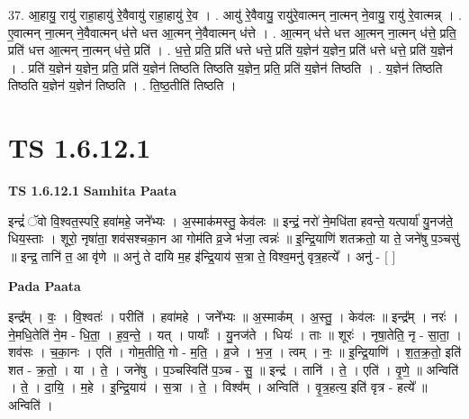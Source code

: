 \documentclass[17pt]{extarticle}
\begin{document}
37. आ॒हायु॒ रायु॑ राहा॒हायु॑ रे॒वैवायु॑ राहा॒हायु॑ रे॒व । . आयु॑ रे॒वैवायु॒ रायु॑रे॒वात्मन् ना॒त्मन् ने॒वायु॒ रायु॑ रे॒वात्मन्न् । . ए॒वात्मन् ना॒त्मन् ने॒वैवात्मन् ध॑त्ते धत्त आ॒त्मन् ने॒वैवात्मन् ध॑त्ते । . आ॒त्मन् ध॑त्ते धत्त आ॒त्मन् ना॒त्मन् ध॑त्ते॒ प्रति॒ प्रति॑ धत्त आ॒त्मन् ना॒त्मन् ध॑त्ते॒ प्रति॑ । . ध॒त्ते॒ प्रति॒ प्रति॑ धत्ते धत्ते॒ प्रति॑ य॒ज्ञेन॑ य॒ज्ञेन॒ प्रति॑ धत्ते धत्ते॒ प्रति॑ य॒ज्ञेन॑ । . प्रति॑ य॒ज्ञेन॑ य॒ज्ञेन॒ प्रति॒ प्रति॑ य॒ज्ञेन॑ तिष्ठति तिष्ठति य॒ज्ञेन॒ प्रति॒ प्रति॑ य॒ज्ञेन॑ तिष्ठति । . य॒ज्ञेन॑ तिष्ठति तिष्ठति य॒ज्ञेन॑ य॒ज्ञेन॑ तिष्ठति । . ति॒ष्ठ॒तीति॑ तिष्ठति । \newline
\pagebreak
{}

\section{ TS 1.6.12.1 }

\textbf{TS 1.6.12.1 } \newline
\textbf{Samhita Paata} \newline

इन्द्रं॑ ॅवो वि॒श्वत॒स्परि॒ हवा॑महे॒ जने᳚भ्यः । अ॒स्माक॑मस्तु॒ केव॑लः ॥ इन्द्रं॒ नरो॑ ने॒मधि॑ता हवन्ते॒ यत्पार्या॑ यु॒नज॑ते॒ धिय॒स्ताः । शूरो॒ नृषा॑ता॒ शव॑सश्चका॒न आ गोम॑ति व्र॒जे भ॑जा॒ त्वन्नः॑ ॥ इ॒न्द्रि॒याणि॑ शतक्रतो॒ या ते॒ जने॑षु प॒ञ्चसु॑ ॥ इन्द्र॒ तानि॑ त॒ आ वृ॑णे ॥ अनु॑ ते दायि म॒ह इ॑न्द्रि॒याय॑ स॒त्रा ते॒ विश्व॒मनु॑ वृत्र॒हत्ये᳚ । अनु॑ - [ ] \newline

\textbf{Pada Paata} \newline

इन्द्र᳚म् । वः॒ । वि॒श्वतः॑ । परीति॑ । हवा॑महे । जने᳚भ्यः ॥ अ॒स्माक᳚म् । अ॒स्तु॒ । केव॑लः ॥ इन्द्र᳚म् । नरः॑ । ने॒मधि॒तेति॑ ने॒म - धि॒ता॒ । ह॒व॒न्ते॒ । यत् । पार्याः᳚ । यु॒नज॑ते । धियः॑ । ताः ॥ शूरः॑ । नृषा॒तेति॒ नृ - सा॒ता॒ । शव॑सः । च॒का॒नः । एति॑ । गोम॒तीति॒ गो - म॒ति॒ । व्र॒जे । भ॒ज॒ । त्वम् । नः॒ ॥ इ॒न्द्रि॒याणि॑ । श॒त॒क्र॒तो॒ इति॑ शत - क्र॒तो॒ । या । ते॒ । जने॑षु । प॒ञ्चस्विति॑॑ प॒ञ्च - सु॒ ॥ इन्द्र॑ । तानि॑ । ते॒ । एति॑ । वृ॒णे॒ ॥ अन्विति॑ । ते॒ । दा॒यि॒ । म॒हे । इ॒न्द्रि॒याय॑ । स॒त्रा । ते॒ । विश्व᳚म् । अन्विति॑ । वृ॒त्र॒हत्य॒ इति॑ वृत्र - हत्ये᳚ ॥ अन्विति॑ ।  \newline
\end{document}
